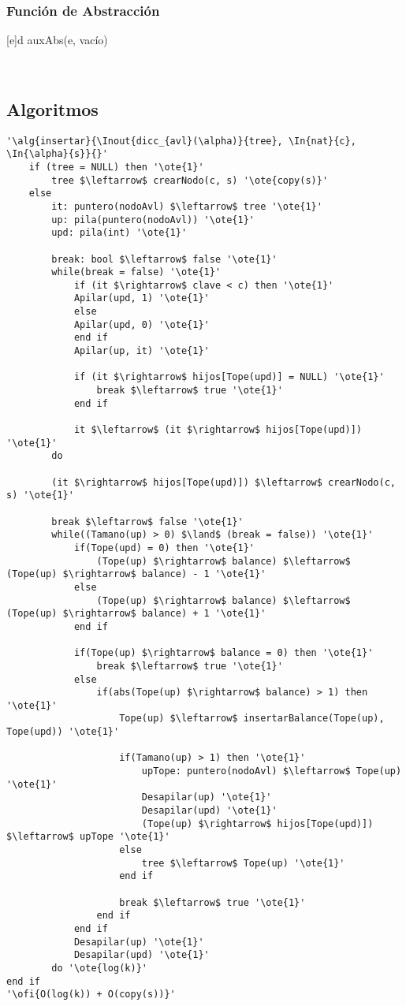 	\subsubsection{Función de Abstracción}
	  {d}{
		auxAbs(e, vacío)
	}

	~



\subsection{Algoritmos}

\begin{lstlisting}[mathescape]
'\alg{insertar}{\Inout{dicc_{avl}(\alpha)}{tree}, \In{nat}{c}, \In{\alpha}{s}}{}'
	if (tree = NULL) then '\ote{1}'
		tree $\leftarrow$ crearNodo(c, s) '\ote{copy(s)}'
	else
		it: puntero(nodoAvl) $\leftarrow$ tree '\ote{1}'
		up: pila(puntero(nodoAvl)) '\ote{1}'
		upd: pila(int) '\ote{1}'

		break: bool $\leftarrow$ false '\ote{1}'
		while(break = false) '\ote{1}'
			if (it $\rightarrow$ clave < c)	then '\ote{1}'
			Apilar(upd, 1) '\ote{1}'
			else
			Apilar(upd, 0) '\ote{1}'
			end if
			Apilar(up, it) '\ote{1}'

			if (it $\rightarrow$ hijos[Tope(upd)] = NULL) '\ote{1}'
				break $\leftarrow$ true '\ote{1}'
			end if

			it $\leftarrow$ (it $\rightarrow$ hijos[Tope(upd)]) '\ote{1}'
		do

		(it $\rightarrow$ hijos[Tope(upd)]) $\leftarrow$ crearNodo(c, s) '\ote{1}'

		break $\leftarrow$ false '\ote{1}'
		while((Tamano(up) > 0) $\land$ (break = false)) '\ote{1}'
			if(Tope(upd) = 0) then '\ote{1}'
				(Tope(up) $\rightarrow$ balance) $\leftarrow$ (Tope(up)	$\rightarrow$ balance) - 1 '\ote{1}'
			else
				(Tope(up) $\rightarrow$ balance) $\leftarrow$ (Tope(up)	$\rightarrow$ balance) + 1 '\ote{1}'
			end if

			if(Tope(up) $\rightarrow$ balance = 0) then '\ote{1}'
				break $\leftarrow$ true '\ote{1}'
			else
				if(abs(Tope(up) $\rightarrow$ balance) > 1) then '\ote{1}'
					Tope(up) $\leftarrow$ insertarBalance(Tope(up), Tope(upd)) '\ote{1}'

					if(Tamano(up) > 1) then '\ote{1}'
						upTope: puntero(nodoAvl) $\leftarrow$ Tope(up) '\ote{1}'
						Desapilar(up) '\ote{1}'
						Desapilar(upd) '\ote{1}'
						(Tope(up) $\rightarrow$ hijos[Tope(upd)]) $\leftarrow$ upTope '\ote{1}'
					else
						tree $\leftarrow$ Tope(up) '\ote{1}'
					end if

					break $\leftarrow$ true '\ote{1}'
				end if
			end if
			Desapilar(up) '\ote{1}'
			Desapilar(upd) '\ote{1}'
		do '\ote{log(k)}'
end if
'\ofi{O(log(k)) + O(copy(s))}'
\end{lstlisting}


